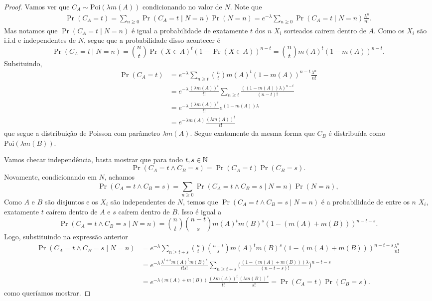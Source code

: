 \begin{proof}
	Vamos ver que $C_A \sim \text{Poi}(\lambda m(A))$ condicionando no
	valor de $N$. Note que
	\begin{align*}
		\Pr(C_A = t) = \sum_{n \geq 0} \Pr(C_A = t \mid N = n) \Pr(N = n) =
		e^{-\lambda}\sum_{n \geq 0} \Pr(C_A = t \mid N = n)\frac{\lambda^n}{n!}.
	\end{align*}
	Mas notamos que $\Pr(C_A = t \mid N = n)$ é igual a probabilidade de
	exatamente $t$ dos $n$ $X_i$ sorteados cairem dentro de $A$. Como os
	$X_i$ são i.i.d e independentes de
	$N$, segue que a probabilidade disso acontecer é
	\[
		\Pr(C_A = t \mid N = n) = \binom{n}{t}\Pr(X \in A)^t(1 - \Pr(X \in
		A))^{n-t} = \binom{n}{t}m(A)^t(1-m(A))^{n-t}.
	\]
	Subsituindo,
	\begin{align*}
		\Pr(C_A = t) &= e^{-\lambda}\sum_{n \geq t}
		\binom{n}{t}m(A)^t(1-m(A))^{n-t}\frac{\lambda^n}{n!}\\
		&= e^{-\lambda}\frac{(\lambda m(A))^t}{t!}\sum_{n \geq t}
		\frac{((1-m(A))\lambda)^{n-t}}{(n-t)!}\\
		&= e^{-\lambda}\frac{(\lambda m(A))^t}{t!} e^{(1-m(A))\lambda}\\
		&= e^{-\lambda m(A)} \frac{(\lambda m(A))^t}{t!}
	\end{align*}
	que segue a distribuição de Poisson com parâmetro $\lambda m(A)$.
	Segue exatamente da mesma forma que $C_B$ é distribuída como
	$\text{Poi}(\lambda m(B))$.

	Vamos checar independência, basta mostrar que para todo $t,s \in \mathbb{N}$
	\[
		\Pr(C_A = t \land C_B = s) = \Pr(C_A = t)\Pr(C_B = s).
	\]
	Novamente, condicionando em $N$, achamos
	\[
		\Pr(C_A = t \land C_B = s) = \sum_{n \geq 0} \Pr(C_A = t \land C_B
		= s \mid N = n) \Pr(N = n),
	\]
	Como $A$ e $B$ são disjuntos e os $X_i$ são independentes de $N$,
	temos que $\Pr(C_A = t \land C_B = s \mid N = n)$ é a probabilidade
	de entre os $n$ $X_i$, exatamente $t$ caírem dentro de $A$ e $s$
	caírem dentro de $B$. Isso é igual a
	\[
		\Pr(C_A = t \land C_B = s \mid N = n) = \binom{n}{t} \binom{n -
		t}{s}m(A)^t m(B)^s (1 - (m(A) + m(B)))^{n - t - s}.
	\]
	Logo, substituindo na expressão anterior
	\begin{align*}
		\Pr(C_A = t \land C_B = s \mid N = n) &= e^{-\lambda} \sum_{n \geq
		t + s}  \binom{n}{t} \binom{n - t}{s}m(A)^t m(B)^s (1 - (m(A) +
		m(B)))^{n - t - s} \frac{\lambda^n}{n!}\\
		&= e^{-\lambda} \frac{\lambda^{t+s} m(A)^t m(B)^s}{t!s!} \sum_{n
		\geq t + s}\bigg(\frac{(1 - (m(A) + m(B))) \lambda}{(n-t-s)!}\bigg)^{n-t-s}\\
		&= e^{-\lambda(m(A) + m(B))}\frac{(\lambda m(A))^t}{t!}
		\frac{(\lambda m(B))^s}{s!} = \Pr(C_A = t) \Pr(C_B = s).
	\end{align*}
	como queríamos mostrar.
\end{proof}
